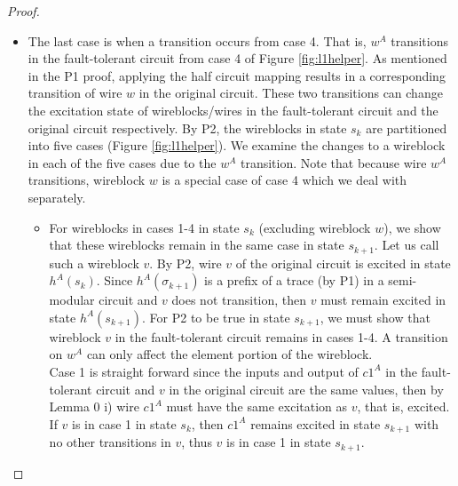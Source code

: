 \documentclass[12pt]{report}
\begin{document}
\begin{proof}
\begin{itemize}
\item The last case is when a transition occurs from case 4.  That is, $w^A$ transitions in the fault-tolerant circuit from case 4 of Figure \ref{fig:l1helper}.  %
As mentioned in the P1 proof, applying the half circuit mapping results in a corresponding transition of wire $w$ in the original circuit.  
These two transitions can change the excitation state of wireblocks/wires in the fault-tolerant circuit and the original circuit respectively.  By P2, the wireblocks in state $s_k$ are partitioned into five cases (Figure \ref{fig:l1helper}).  We examine the changes to a wireblock in each of the five cases due to the $w^A$ transition.  Note that because wire $w^A$ transitions, wireblock $w$ is a special case of case 4 which we deal with separately.
\begin{itemize}
\item
For wireblocks in cases 1-4 in state $s_k$ (excluding wireblock $w$), we show that these wireblocks remain in the same case in state $s_{k+1}$.  Let us call such a wireblock $v$.  By P2, wire $v$ of the original circuit is excited in state $h^A(s_{k})$.  Since $h^A(\sigma_{k+1})$ is a prefix of a trace (by P1) in a semi-modular circuit and $v$ does not transition, then $v$ must remain excited in state $h^A(s_{k+1})$.  For P2 to be true in state $s_{k+1}$, we must show that wireblock $v$ in the fault-tolerant circuit remains in cases 1-4.  A transition on $w^A$ can only affect the element portion of the wireblock.  \\
Case 1 is straight forward since the inputs and output of $c1^A$ in the fault-tolerant circuit and $v$ in the original circuit are the same values, then by Lemma 0 i) wire $c1^A$ must have the same excitation as $v$, that is, excited.  If $v$ is in case 1 in state $s_k$, then $c1^A$ remains excited in state $s_{k+1}$ with no other transitions in $v$, thus $v$ is in case 1 in state $s_{k+1}$.  \\

\end{itemize}
\end{itemize}
\end{proof}
\end{document}
